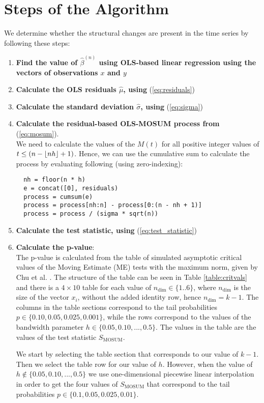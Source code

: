 \documentclass[main.tex]{subfiles}
\begin{document}
\section{Steps of the Algorithm}
We determine whether the structural changes are present in the time series by following these steps:
\label{sec:the_algorithm_steps}
\begin{enumerate}
\item \textbf{Find the value of $\hat{\beta}^{(n)}$ using OLS-based linear
  regression using the vectors of observations $x$ and $y$}
\item \textbf{Calculate the OLS residuals $\hat{\mu}$, using} (\ref{eq:residuals})
\item \textbf{Calculate the standard deviation $\hat{\sigma}$, using} (\ref{eq:sigma})
\item \textbf{Calculate the residual-based OLS-MOSUM process from} (\ref{eq:mosum}). \\
  We need to calculate the values of the $M(t)$ for all positive integer values of
  $t \leq (n - \lfloor nh\rfloor + 1)$. Hence, we can use the cumulative sum to
  calculate the process by evaluating following
  (using zero-indexing):
  \begin{verbatim}
  nh = floor(n * h)
  e = concat([0], residuals)
  process = cumsum(e)
  process = process[nh:n] - process[0:(n - nh + 1)]
  process = process / (sigma * sqrt(n))
  \end{verbatim}
\item \textbf{Calculate the test statistic, using} (\ref{eq:test_statistic})
\item \textbf{Calculate the p-value}:\\
  The p-value is calculated from the table of
  simulated asymptotic critical values of the Moving Estimate (ME) tests with
  the maximum norm, given by Chu et al. \cite{moving_estimate_test}. The structure of the table can
  be seen in Table \ref{table:critvals} and there is a $4 \times 10$ table for
  each value of $n_{\text{dim}} \in \{1..6\}$, where $n_{\text{dim}}$ is the
  size of the vector $x_i$, without the added identity row, hence
  $n_{\text{dim}} = k - 1$. The columns in the table sections correspond to the
  tail probabilities $p \in \{0.10, 0.05, 0.025, 0.001\}$, while the rows
  correspond to the values of the bandwidth parameter
  $h \in \{0.05, 0.10, ..., 0.5\}$. The values in the table are the values of
  the test statistic $S_{\text{MOSUM}}$.

  We start by selecting the table section that corresponds to our value of
  $k-1$. Then we select the table row for our value of $h$.
  However, when the value of $h \notin \{0.05, 0.10, ..., 0.5\}$
  we use one-dimensional piecewise linear interpolation in order to get the four
  values of $S_{\text{MOSUM}}$ that correspond to the tail probabilities 
  $p \in \{0.1, 0.05, 0.025, 0.01\}$. 


\end{enumerate}
\end{document}
